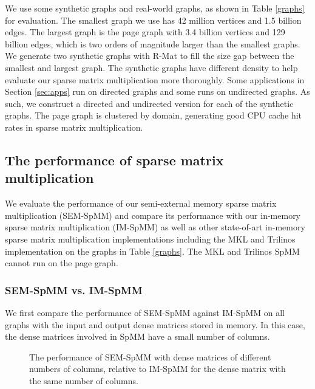 We use some synthetic graphs and real-world graphs, as shown in Table
\ref{graphs} for evaluation. The smallest graph we use has 42 million vertices
and 1.5 billion
edges. The largest graph is the page graph with 3.4 billion vertices
and 129 billion edges, which is two orders of magnitude larger than the smallest
graphs. We generate two synthetic graphs with R-Mat \cite{rmat} to fill
the size gap between the smallest and largest graph. The synthetic graphs
have different density to help evaluate our sparse matrix multiplication more
thoroughly. Some applications in Section \ref{sec:apps} run on directed graphs
and some runs on undirected graphs. As such, we construct a directed and
undirected version for each of the synthetic graphs. The page graph is clustered
by domain, generating good CPU cache hit rates in sparse matrix multiplication.

\subsection{The performance of sparse matrix multiplication}

We evaluate the performance of our semi-external memory sparse matrix
multiplication (SEM-SpMM) and compare its performance with our in-memory sparse
matrix multiplication (IM-SpMM) as well as other state-of-art in-memory sparse
matrix multiplication implementations including the MKL and Trilinos
implementation on the graphs in Table \ref{graphs}. The MKL and Trilinos SpMM
cannot run on the page graph.

\subsubsection{SEM-SpMM vs. IM-SpMM}

We first compare the performance of SEM-SpMM against IM-SpMM on all graphs with
the input and output dense matrices stored in memory. In this case, the dense
matrices involved in SpMM have a small number of columns.

\begin{figure}
	\begin{center}
		\footnotesize
		
		\caption{The performance of SEM-SpMM with dense matrices of different
			numbers of columns, relative to IM-SpMM for the dense matrix with
			the same number of columns.}
		\label{perf:spmm_comp}
	\end{center}
\end{figure}

%		


